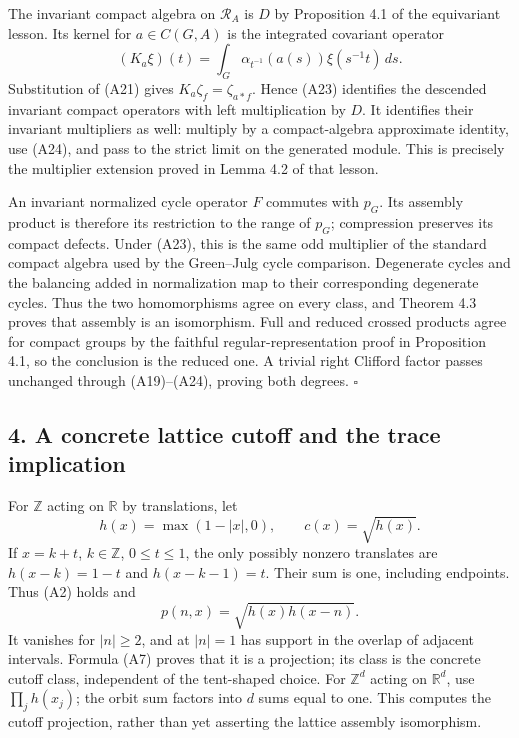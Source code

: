 \documentclass[
  11pt,
]{article}
\begin{document}
The invariant compact algebra on \(\mathcal R_A\) is \(D\) by
Proposition 4.1 of the equivariant lesson. Its kernel for
\(a\in C(G,A)\) is the integrated covariant operator \[
(K_a\xi)(t)=\int_G\alpha_{t^{-1}}(a(s))\xi(s^{-1}t)\,ds.
\tag{A24}
\] Substitution of (A21) gives \(K_a\zeta_f=\zeta_{a*f}\). Hence (A23)
identifies the descended invariant compact operators with left
multiplication by \(D\). It identifies their invariant multipliers as
well: multiply by a compact-algebra approximate identity, use (A24), and
pass to the strict limit on the generated module. This is precisely the
multiplier extension proved in Lemma 4.2 of that lesson.

An invariant normalized cycle operator \(F\) commutes with \(p_G\). Its
assembly product is therefore its restriction to the range of \(p_G\);
compression preserves its compact defects. Under (A23), this is the same
odd multiplier of the standard compact algebra used by the Green--Julg
cycle comparison. Degenerate cycles and the balancing added in
normalization map to their corresponding degenerate cycles. Thus the two
homomorphisms agree on every class, and Theorem 4.3 proves that assembly
is an isomorphism. Full and reduced crossed products agree for compact
groups by the faithful regular-representation proof in Proposition 4.1,
so the conclusion is the reduced one. A trivial right Clifford factor
passes unchanged through (A19)--(A24), proving both degrees. \(\square\)

\subsection{4. A concrete lattice cutoff and the trace
implication}\label{a-concrete-lattice-cutoff-and-the-trace-implication}

For \(\mathbb Z\) acting on \(\mathbb R\) by translations, let \[
h(x)=\max(1-|x|,0),\qquad c(x)=\sqrt{h(x)}.
\tag{A25}
\] If \(x=k+t\), \(k\in\mathbb Z\), \(0\leq t\leq1\), the only possibly
nonzero translates are \(h(x-k)=1-t\) and \(h(x-k-1)=t\). Their sum is
one, including endpoints. Thus (A2) holds and \[
p(n,x)=\sqrt{h(x)h(x-n)}.
\tag{A26}
\] It vanishes for \(|n|\geq2\), and at \(|n|=1\) has support in the
overlap of adjacent intervals. Formula (A7) proves that it is a
projection; its class is the concrete cutoff class, independent of the
tent-shaped choice. For \(\mathbb Z^d\) acting on \(\mathbb R^d\), use
\(\prod_j h(x_j)\); the orbit sum factors into \(d\) sums equal to one.
This computes the cutoff projection, rather than yet asserting the
lattice assembly isomorphism.
\end{document}
